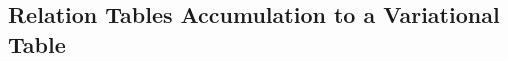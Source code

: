 \subsection{Relation Tables Accumulation to a Variational Table}
\label{sec:accum}



\begin{example}
\label{eg:acc-table-from-conf}
\end{example}

\begin{example}
\label{eg:acc-table-from-group}
\end{example}